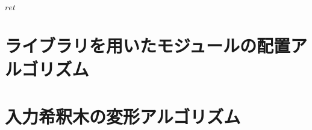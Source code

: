 \begin{algorithm}[tbp]
\begin{algorithmic}[1]
     \Return $\mathit{ret}$
 \end{algorithmic}
\end{algorithm}

\section{ライブラリを用いたモジュールの配置{アルゴリズム}}
\section{入力希釈木の変形アルゴリズム}



